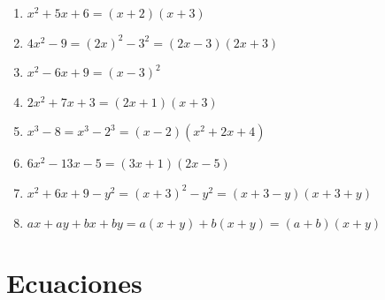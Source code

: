 \documentclass[12pt,a4paper]{article}
\begin{document}
\begin{enumerate}
    \item $x^2 + 5x + 6 = (x + 2)(x + 3)$
    
    \item $4x^2 - 9 = (2x)^2 - 3^2 = (2x - 3)(2x + 3)$
    
    \item $x^2 - 6x + 9 = (x - 3)^2$
    
    \item $2x^2 + 7x + 3 = (2x + 1)(x + 3)$
    
    \item $x^3 - 8 = x^3 - 2^3 = (x - 2)(x^2 + 2x + 4)$
    
    \item $6x^2 - 13x - 5 = (3x + 1)(2x - 5)$
    
    \item $x^2 + 6x + 9 - y^2 = (x + 3)^2 - y^2 = (x + 3 - y)(x + 3 + y)$
    
    \item $ax + ay + bx + by = a(x + y) + b(x + y) = (a + b)(x + y)$
\end{enumerate}

\section{Ecuaciones}
\end{document}
